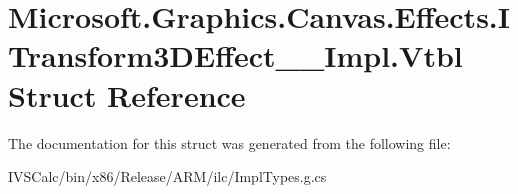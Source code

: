 \hypertarget{struct_microsoft_1_1_graphics_1_1_canvas_1_1_effects_1_1_i_transform3_d_effect_____impl_1_1_vtbl}{}\section{Microsoft.\+Graphics.\+Canvas.\+Effects.\+I\+Transform3\+D\+Effect\+\_\+\+\_\+\+Impl.\+Vtbl Struct Reference}
\label{struct_microsoft_1_1_graphics_1_1_canvas_1_1_effects_1_1_i_transform3_d_effect_____impl_1_1_vtbl}


The documentation for this struct was generated from the following file\+:\begin{DoxyCompactItemize}
\item 
I\+V\+S\+Calc/bin/x86/\+Release/\+A\+R\+M/ilc/Impl\+Types.\+g.\+cs\end{DoxyCompactItemize}
